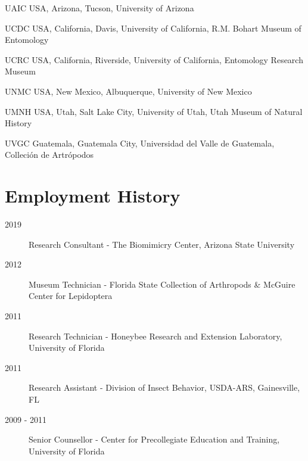 \documentclass[12pt,a4paper]{article}
\begin{document}
\begin{collections}
			\item [UAIC] USA, Arizona, Tucson, University of Arizona
			\item [UCDC] USA, California, Davis, University of California, R.M. Bohart Museum of Entomology
			\item [UCRC] USA, California, Riverside, University of California, Entomology Research Museum
			\item [UNMC] USA, New Mexico, Albuquerque, University of New Mexico
			\item [UMNH] USA, Utah, Salt Lake City, University of Utah, Utah Museum of Natural History
			\item [UVGC] Guatemala, Guatemala City, Universidad del Valle de Guatemala, Colleci\'{o}n de Artr\'{o}podos
		\end{collections}

\section*{Employment History}
	\begin{description}
		\item [2019] Research Consultant - The Biomimicry Center, Arizona State University
		\item [2012] Museum Technician - Florida State Collection of Arthropods \& McGuire Center for Lepidoptera
		\item [2011] Research Technician - Honeybee Research and Extension Laboratory, University of Florida
		\item [2011] Research Assistant - Division of Insect Behavior, USDA-ARS, Gainesville, FL
		\item [2009 - 2011] Senior Counsellor - Center for Precollegiate Education and Training, University of Florida
	\end{description}
\end{document}
